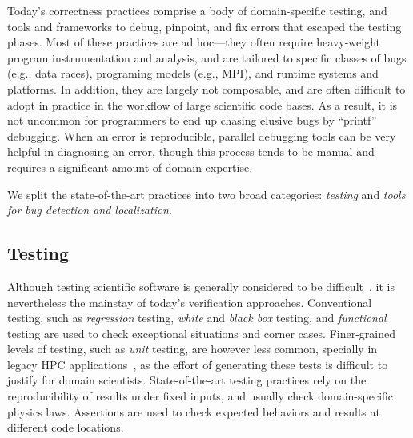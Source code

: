 \newcommand{\subheader}[1]{ \textbf{#1}}




Today’s correctness practices comprise a body of domain-specific testing,
and tools and frameworks to debug, pinpoint, and fix errors that escaped
the testing phases. Most of these practices are ad hoc---they often require
heavy-weight program instrumentation and analysis, and are tailored to 
specific classes of bugs (e.g., data races), programing models (e.g., MPI),
and runtime systems and platforms. In addition, they are largely not composable,
and are often difficult to adopt in practice in the workflow of large scientific
code bases.
%
As a result, it is not uncommon for programmers to end up chasing 
elusive bugs by ``printf'' debugging. When an error is reproducible, 
parallel debugging tools can be very helpful in diagnosing an error, 
though this process tends to be manual and requires a significant 
amount of domain expertise.
%

We split the state-of-the-art practices into two broad categories:
\textit{testing} and \textit{tools for bug detection and localization}.







\subsection{Testing}

Although testing scientific software is generally considered to be 
difficult~\cite{kelly2008}, it is nevertheless the mainstay
of today's verification
approaches.
Conventional testing, such as \textit{regression} testing, \textit{white} 
and \textit{black box} testing, and \textit{functional} testing are used to 
check exceptional situations and corner cases. Finer-grained levels of 
testing, such as \textit{unit} testing, are however less common, specially 
in legacy HPC applications~\cite{hovy2016towards}, as the effort of 
generating these tests is difficult to justify for domain scientists.
State-of-the-art testing practices rely on the reproducibility of results 
under fixed inputs, and usually check domain-specific physics laws.
Assertions are used to check expected behaviors and results at different code locations.

